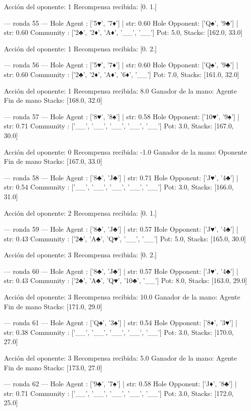 Acción del oponente: 1
Recompensa recibida: [0. 1.]

--- ronda 55 ---
Hole Agent : ['5♥', '7♦'] | str: 0.60
Hole Opponent: ['Q♠', '9♣'] | str: 0.60
Community  : ['2♣', '2♦', 'A♦', '__', '__']
Pot: 5.0, Stacks: [162.0, 33.0]

Acción del oponente: 1
Recompensa recibida: [0. 2.]

--- ronda 56 ---
Hole Agent : ['5♥', '7♦'] | str: 0.60
Hole Opponent: ['Q♠', '9♣'] | str: 0.60
Community  : ['2♣', '2♦', 'A♦', '6♦', '__']
Pot: 7.0, Stacks: [161.0, 32.0]

Acción del oponente: 1
Recompensa recibida: 8.0
Ganador de la mano: Agente
Fin de mano Stacks: [168.0, 32.0]


--- ronda 57 ---
Hole Agent : ['8♥', '8♠'] | str: 0.58
Hole Opponent: ['10♥', '9♠'] | str: 0.71
Community  : ['__', '__', '__', '__', '__']
Pot: 3.0, Stacks: [167.0, 30.0]

Acción del oponente: 0
Recompensa recibida: -1.0
Ganador de la mano: Oponente
Fin de mano Stacks: [167.0, 33.0]


--- ronda 58 ---
Hole Agent : ['8♣', 'J♣'] | str: 0.71
Hole Opponent: ['J♥', '4♣'] | str: 0.54
Community  : ['__', '__', '__', '__', '__']
Pot: 3.0, Stacks: [166.0, 31.0]

Acción del oponente: 2
Recompensa recibida: [0. 1.]

--- ronda 59 ---
Hole Agent : ['8♣', 'J♣'] | str: 0.57
Hole Opponent: ['J♥', '4♣'] | str: 0.43
Community  : ['2♣', 'A♣', 'Q♥', '__', '__']
Pot: 5.0, Stacks: [165.0, 30.0]

Acción del oponente: 3
Recompensa recibida: [0. 2.]

--- ronda 60 ---
Hole Agent : ['8♣', 'J♣'] | str: 0.57
Hole Opponent: ['J♥', '4♣'] | str: 0.43
Community  : ['2♣', 'A♣', 'Q♥', '10♣', '__']
Pot: 8.0, Stacks: [163.0, 29.0]

Acción del oponente: 3
Recompensa recibida: 10.0
Ganador de la mano: Agente
Fin de mano Stacks: [171.0, 29.0]


--- ronda 61 ---
Hole Agent : ['Q♠', '3♠'] | str: 0.54
Hole Opponent: ['8♦', '3♥'] | str: 0.38
Community  : ['__', '__', '__', '__', '__']
Pot: 3.0, Stacks: [170.0, 27.0]

Acción del oponente: 3
Recompensa recibida: 5.0
Ganador de la mano: Agente
Fin de mano Stacks: [173.0, 27.0]


--- ronda 62 ---
Hole Agent : ['9♣', '7♠'] | str: 0.58
Hole Opponent: ['J♦', '8♣'] | str: 0.71
Community  : ['__', '__', '__', '__', '__']
Pot: 3.0, Stacks: [172.0, 25.0]

